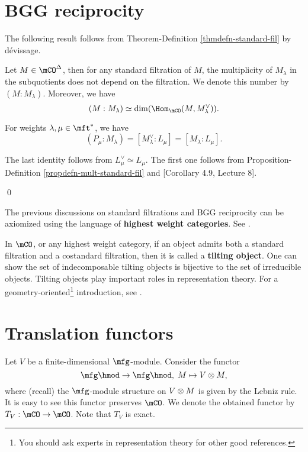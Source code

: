 \section{BGG reciprocity}

	The following result follows from Theorem-Definition \ref{thmdefn-standard-fil} by dévissage.

	\begin{propdefn}
		\label{propdefn-mult-standard-fil}
		Let $M\in \mCO^\Delta$, then for any standard filtration of $M$, the multiplicity of $M_\lambda$ in the subquotients does not depend on the filtration. We denote this number by $(M: M_\lambda)$. Moreover, we have
		\[
			(M: M_\lambda) \simeq \dim( \Hom_\mCO(M, M_\lambda^\vee) ).
		\]
	\end{propdefn}

	\begin{thm}
		\label{thm-BGG-rec}
		For weights $\lambda,\mu\in \mft^*$, we have
		\[
			(P_\mu: M_\lambda) = [M_\lambda^\vee: L_\mu] = [M_\lambda:L_\mu].
		\]
	\end{thm}

	\proof
		The last identity follows from $L_\mu^\vee \simeq L_\mu$. The first one follows from Proposition-Definition \ref{propdefn-mult-standard-fil} and [Corollary 4.9, Lecture 8].

	\qed

	\begin{rem}
		The previous discussions on standard filtrations and BGG reciprocity can be axiomized using the language of \textbf{highest weight categories}. See \cite{CPS}.
	\end{rem}

	\begin{rem}
		In $\mCO$, or any highest weight category, if an object admits both a standard filtration and a costandard filtration, then it is called a \textbf{tilting object}. One can show the set of indecomposable tilting objects is bijective to the set of irreducible objects. Tilting objects play important roles in representation theory. For a geometry-oriented\footnote{You should ask experts in representation theory for other good references.} introduction, see \cite{BBM}.
	\end{rem}

\section{Translation functors}
	
	\begin{constr}
		Let $V$ be a finite-dimensional $\mfg$-module. Consider the functor
		\[
			\mfg\hmod \to \mfg\hmod,\; M\mapsto V\ot M,
		\]
		where (recall) the $\mfg$-module structure on $V\ot M$ is given by the Lebniz rule. It is easy to see this functor preserves $\mCO$. We denote the obtained functor by $T_V:\mCO \to \mCO$. Note that $T_V$ is exact.
	\end{constr}

